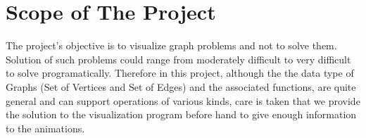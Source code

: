 \section{Scope of The Project}
The project's objective is to visualize graph problems and not to solve them.
Solution of such problems could range from moderately difficult to very
difficult to solve programatically.  Therefore in this project, although the
the data type of Graphs (Set of Vertices and Set of Edges) and the associated
functions, are quite general and can support operations of various kinds, care
is taken that we provide the solution to the visualization program before hand
to give enough information to the animations.
